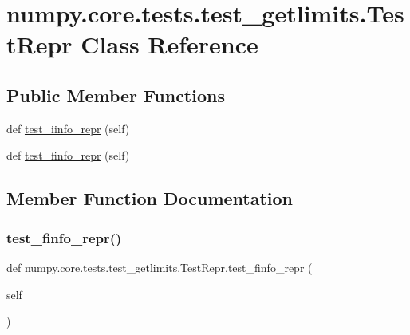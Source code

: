 \hypertarget{classnumpy_1_1core_1_1tests_1_1test__getlimits_1_1TestRepr}{}\section{numpy.\+core.\+tests.\+test\+\_\+getlimits.\+Test\+Repr Class Reference}
\label{classnumpy_1_1core_1_1tests_1_1test__getlimits_1_1TestRepr}
\subsection*{Public Member Functions}
\begin{DoxyCompactItemize}
\item 
def \hyperlink{classnumpy_1_1core_1_1tests_1_1test__getlimits_1_1TestRepr_affce917648f022e85f529d2d1a1ddfea}{test\+\_\+iinfo\+\_\+repr} (self)
\item 
def \hyperlink{classnumpy_1_1core_1_1tests_1_1test__getlimits_1_1TestRepr_a65b818731995872d8939fc6bc7747faa}{test\+\_\+finfo\+\_\+repr} (self)
\end{DoxyCompactItemize}


\subsection{Member Function Documentation}
\mbox{\label{classnumpy_1_1core_1_1tests_1_1test__getlimits_1_1TestRepr_a65b818731995872d8939fc6bc7747faa}} 
\subsubsection{\texorpdfstring{test\+\_\+finfo\+\_\+repr()}{test\_finfo\_repr()}}
{\footnotesize\ttfamily def numpy.\+core.\+tests.\+test\+\_\+getlimits.\+Test\+Repr.\+test\+\_\+finfo\+\_\+repr (\begin{DoxyParamCaption}\item[{}]{self }\end{DoxyParamCaption})}

